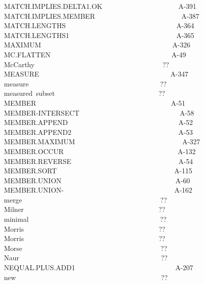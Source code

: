 \documentclass[11pt]{book}
\newenvironment{pubasis}{\begin{flushleft}\ttfamily\small}{\normalsize\rmfamily\end{flushleft}}
\begin{document}
\begin{pubasis}
MATCH.IMPLIES.DELTA1.OK~~~~~~~~~~~~~~~~~~~~~~A-391\\
MATCH.IMPLIES.MEMBER~~~~~~~~~~~~~~~~~~~~~~~~~A-387\\
MATCH.LENGTHS~~~~~~~~~~~~~~~~~~~~~~~~~~~~~~~~A-364\\
MATCH.LENGTHS1~~~~~~~~~~~~~~~~~~~~~~~~~~~~~~~A-365\\
MAXIMUM~~~~~~~~~~~~~~~~~~~~~~~~~~~~~~~~~~~~~~A-326\\
MC.FLAT\-TEN~~~~~~~~~~~~~~~~~~~~~~~~~~~~~~~~~~~A-49\\
McCarthy~~~~~~~~~~~~~~~~~~~~~~~~~~~~~~~~~~~~~??\\
MEASURE~~~~~~~~~~~~~~~~~~~~~~~~~~~~~~~~~~~~~~A-347\\
measure~~~~~~~~~~~~~~~~~~~~~~~~~~~~~~~~~~~~~~??\\
measured~subset~~~~~~~~~~~~~~~~~~~~~~~~~~~~~~??\\
MEMBER~~~~~~~~~~~~~~~~~~~~~~~~~~~~~~~~~~~~~~~A-51\\
MEMBER-INTERSECT~~~~~~~~~~~~~~~~~~~~~~~~~~~~~A-58\\
MEMBER.APPEND~~~~~~~~~~~~~~~~~~~~~~~~~~~~~~~~A-52\\
MEMBER.APPEND2~~~~~~~~~~~~~~~~~~~~~~~~~~~~~~~A-53\\
MEMBER.MAX\-I\-MUM~~~~~~~~~~~~~~~~~~~~~~~~~~~~~~~A-327\\
MEMBER.OCCUR~~~~~~~~~~~~~~~~~~~~~~~~~~~~~~~~~A-132\\
MEMBER.REVERSE~~~~~~~~~~~~~~~~~~~~~~~~~~~~~~~A-54\\
MEMBER.SORT~~~~~~~~~~~~~~~~~~~~~~~~~~~~~~~~~~A-115\\
MEMBER.UNION~~~~~~~~~~~~~~~~~~~~~~~~~~~~~~~~~A-60\\
MEMBER.UNION-~~~~~~~~~~~~~~~~~~~~~~~~~~~~~~~~A-162\\
merge~~~~~~~~~~~~~~~~~~~~~~~~~~~~~~~~~~~~~~~~??\\
Milner~~~~~~~~~~~~~~~~~~~~~~~~~~~~~~~~~~~~~~~??\\
minimal~~~~~~~~~~~~~~~~~~~~~~~~~~~~~~~~~~~~~~??\\
Morris~~~~~~~~~~~~~~~~~~~~~~~~~~~~~~~~~~~~~~~??\\
Morris~~~~~~~~~~~~~~~~~~~~~~~~~~~~~~~~~~~~~~~??\\
Morse~~~~~~~~~~~~~~~~~~~~~~~~~~~~~~~~~~~~~~~~??\\
Naur~~~~~~~~~~~~~~~~~~~~~~~~~~~~~~~~~~~~~~~~~??\\
NEQUAL.PLUS.ADD1~~~~~~~~~~~~~~~~~~~~~~~~~~~~~A-207\\
new~~~~~~~~~~~~~~~~~~~~~~~~~~~~~~~~~~~~~~~~~~??\\

\end{pubasis}
\end{document}
